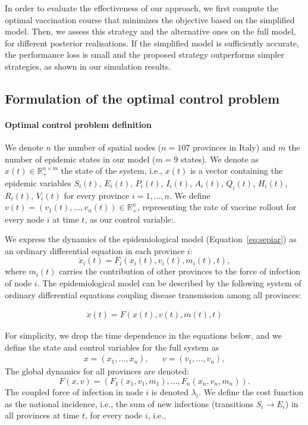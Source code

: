 In order to evaluate the effectiveness of our approach, we first compute the optimal vaccination course that minimizes the objective based on the simplified model. Then, we assess this strategy and the alternative ones on the full model, for different posterior realisations. If the simplified model is sufficiently accurate, the performance loss is small and the proposed strategy outperforms simpler strategies, as shown in our simulation results.

\subsection{Formulation of the optimal control problem}
\paragraph{Optimal control problem definition}We denote $n$ the number of spatial nodes ($n=107$ provinces in Italy) and $m$ the number of epidemic states in our model ($m=9$ states).
We denote as $x(t) \in \mathbb{R}_+^{n\times m}$ the state of the system, i.e., $x(t)$ is a vector containing the epidemic variables $S_i(t)$, $E_i(t)$, $P_i(t)$, $I_i(t)$, $A_i(t)$, $Q_i(t)$, $H_i(t)$, $R_i(t)$, $V_i(t)$ for every province $i=1,...,n$. We define $v(t) = (v_1(t),...,v_n(t)) \in \mathbb{R}_+^{n}$, representing the rate of vaccine rollout for every node $i$ at time $t$, as our control variable:. %

We express the dynamics of the epidemiological model (Equation~\eqref{eq:sepiar}) as an ordinary differential equation in each province $i$:
\begin{equation}
    \label{eq:sepiar_compact}
    \dot x_i(t) = F_i(x_i(t),v_i(t), m_i(t), t),
\end{equation}
where $m_i(t)$ carries the contribution of other provinces to the force of infection of node $i$. The epidemiological model can be described by the following system of ordinary differential equations coupling disease transmission among all provinces:

\begin{align}
    \dot x(t) = F(x(t),v(t),m(t),t)
    \label{eq:dynamics}
\end{align}

For simplicity, we drop the time dependence in the equations below, and we define the state and control variables for the full system as
\begin{align*}
    x = (x_1,\ldots,x_n), && v = (v_1,\ldots,v_n),
\end{align*}
The global dynamics for all provinces are denoted:
\begin{equation*}
    F(x,v) = (F_1(x_1,v_1, m_1),\ldots,F_n(x_n,v_n, m_n)).
\end{equation*}
The coupled force of infection in node $i$ is denoted $\lambda_i$. We define the cost function as the national incidence, i.e., the sum of new infections (transitions $S_i\longrightarrow E_i$) in all provinces at time $t$,  for every node $i$, i.e.,

